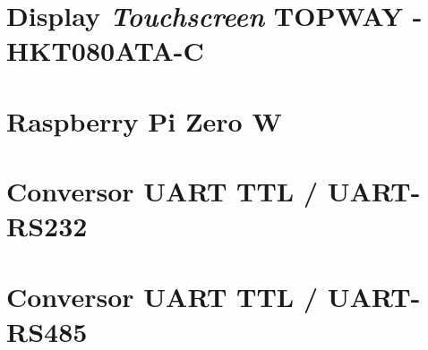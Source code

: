 \section{Display \textit{Touchscreen} TOPWAY - HKT080ATA-C}

\section{Raspberry Pi Zero W}

\section{Conversor UART TTL / UART-RS232}
\section{Conversor UART TTL / UART-RS485}